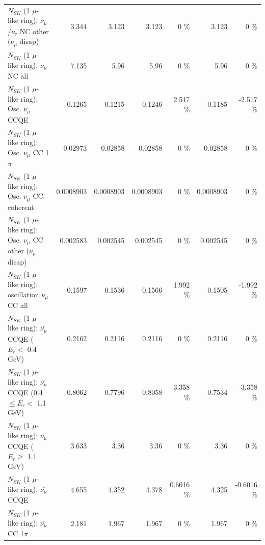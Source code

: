 \begin{table}
\begin{tabular}{| l | r | r | r  r | r  r |}
   $N_{SK}$ (1 $\mu$-like ring): $\nu_\mu$/$\nu_\tau$ NC other ($\nu_\mu$ disap) &           3.344 &           3.123 &           3.123 &        0 \%  &           3.123 &        0 \%  \\ 
                                $N_{SK}$ (1 $\mu$-like ring): $\nu_{\mu}$ NC all &           7.135 &            5.96 &            5.96 &        0 \%  &            5.96 &        0 \%  \\ 
\hline
\hline
                               $N_{SK}$ (1 $\mu$-like ring): Osc. $\nu_\mu$ CCQE &          0.1265 &          0.1215 &          0.1246 &    2.517 \%  &          0.1185 &   -2.517 \%  \\ 
                          $N_{SK}$ (1 $\mu$-like ring): Osc. $\nu_\mu$ CC 1$\pi$ &         0.02973 &         0.02858 &         0.02858 &        0 \%  &         0.02858 &        0 \%  \\ 
                        $N_{SK}$ (1 $\mu$-like ring): Osc. $\nu_\mu$ CC coherent &       0.0008903 &       0.0008903 &       0.0008903 &        0 \%  &       0.0008903 &        0 \%  \\ 
         $N_{SK}$ (1 $\mu$-like ring): Osc. $\nu_\mu$ CC other ($\nu_\mu$ disap) &        0.002583 &        0.002545 &        0.002545 &        0 \%  &        0.002545 &        0 \%  \\ 
                      $N_{SK}$ (1 $\mu$-like ring): oscillation $\nu_\mu$ CC all &          0.1597 &          0.1536 &          0.1566 &    1.992 \%  &          0.1505 &   -1.992 \%  \\ 
\hline
\hline
          $N_{SK}$ (1 $\mu$-like ring): $\bar{\nu_\mu}$ CCQE ($E_{r} <$ 0.4 GeV) &          0.2162 &          0.2116 &          0.2116 &        0 \%  &          0.2116 &        0 \%  \\ 
 $N_{SK}$ (1 $\mu$-like ring): $\bar{\nu_\mu}$ CCQE (0.4 $\leq E_{r} <$ 1.1 GeV) &          0.8062 &          0.7796 &          0.8058 &    3.358 \%  &          0.7534 &   -3.358 \%  \\ 
       $N_{SK}$ (1 $\mu$-like ring): $\bar{\nu_\mu}$ CCQE ($E_{r} \geq$ 1.1 GeV) &           3.633 &            3.36 &            3.36 &        0 \%  &            3.36 &        0 \%  \\ 
\hline
                              $N_{SK}$ (1 $\mu$-like ring): $\bar{\nu_\mu}$ CCQE &           4.655 &           4.352 &           4.378 &   0.6016 \%  &           4.325 &  -0.6016 \%  \\ 
                         $N_{SK}$ (1 $\mu$-like ring): $\bar{\nu_\mu}$ CC 1$\pi$ &           2.181 &           1.967 &           1.967 &        0 \%  &           1.967 &        0 \%  \\ 

\end{tabular}
\end{table}
